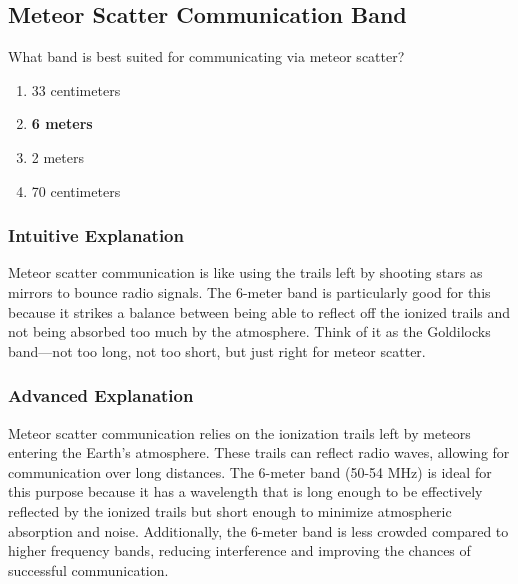 \subsection{Meteor Scatter Communication Band}
\label{T3C07}

\begin{tcolorbox}[colback=gray!10!white,colframe=black!75!black,title=T3C07]
What band is best suited for communicating via meteor scatter?
\begin{enumerate}[noitemsep]
    \item 33 centimeters
    \item \textbf{6 meters}
    \item 2 meters
    \item 70 centimeters
\end{enumerate}
\end{tcolorbox}

\subsubsection*{Intuitive Explanation}
Meteor scatter communication is like using the trails left by shooting stars as mirrors to bounce radio signals. The 6-meter band is particularly good for this because it strikes a balance between being able to reflect off the ionized trails and not being absorbed too much by the atmosphere. Think of it as the Goldilocks band—not too long, not too short, but just right for meteor scatter.

\subsubsection*{Advanced Explanation}
Meteor scatter communication relies on the ionization trails left by meteors entering the Earth's atmosphere. These trails can reflect radio waves, allowing for communication over long distances. The 6-meter band (50-54 MHz) is ideal for this purpose because it has a wavelength that is long enough to be effectively reflected by the ionized trails but short enough to minimize atmospheric absorption and noise. Additionally, the 6-meter band is less crowded compared to higher frequency bands, reducing interference and improving the chances of successful communication.